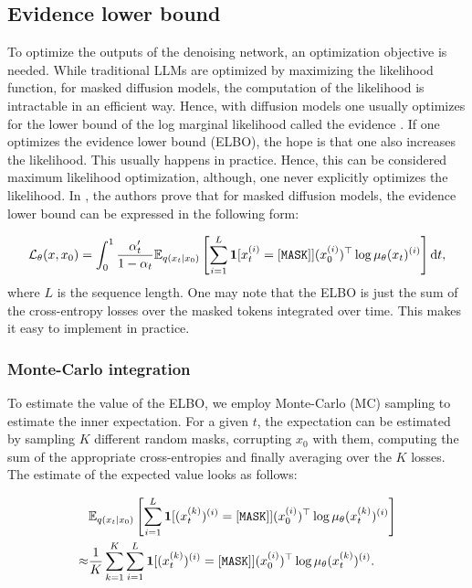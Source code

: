 \subsection{Evidence lower bound}

To optimize the outputs of the denoising network, an optimization objective is needed. While traditional LLMs are optimized by maximizing the likelihood function, for masked diffusion models, the computation of the likelihood is intractable in an efficient way. Hence, with diffusion models one usually optimizes for the lower bound of the log marginal likelihood called the evidence \cite{shi2025simplifiedgeneralizedmaskeddiffusion, austin2021structureddenoisingdiffusionmodels, kingma2021variationaldiffusionmodels}. If one optimizes the evidence lower bound (ELBO), the hope is that one also increases the likelihood. This usually happens in practice. Hence, this can be considered maximum likelihood optimization, although, one never explicitly optimizes the likelihood. In \cite{shi2025simplifiedgeneralizedmaskeddiffusion}, the authors prove that for masked diffusion models, the evidence lower bound can be expressed in the following form:

\begin{equation}
    \mathcal{L}_\theta(x, x_0) = \int_{0}^{1}\frac{\alpha_t'}{1 - \alpha_t}\mathbb{E}_{q(x_t | x_0)}\left[\sum_{i=1}^{L}\bold{1}[x_t^{(i)} = [\mathtt{MASK}]](x_0^{(i)})^\top\log\mu_\theta(x_t)^{(i)}\right] \mathrm{d}t,
    \label{eq:ELBO}
\end{equation}
where $L$ is the sequence length. One may note that the ELBO is just the sum of the cross-entropy losses over the masked tokens integrated over time. This makes it easy to implement in practice.

\subsubsection{Monte-Carlo integration}
\label{sec:MC integration}

To estimate the value of the ELBO, we employ Monte-Carlo (MC) sampling \cite{methodsofnumericalintegration} to estimate the inner expectation. For a given $t$, the expectation can be estimated by sampling $K$ different random masks, corrupting $x_0$ with them, computing the sum of the appropriate cross-entropies and finally averaging over the $K$ losses. The estimate of the expected value looks as follows:

\begin{align*}
    &\mathbb{E}_{q(x_t | x_0)}\left[\sum_{i=1}^{L}\bold{1}[(x_t^{(k)})^{(i)} = [\mathtt{MASK}]](x_0^{(i)})^\top\log\mu_\theta(x_t^{(k)})^{(i)}\right]\\
    \approx&\frac{1}{K}\sum_{k=1}^{K}\sum_{i=1}^{L}\bold{1}[(x_t^{(k)})^{(i)} = [\mathtt{MASK}]](x_0^{(i)})^\top\log\mu_\theta(x_t^{(k)})^{(i)}.
\end{align*}

